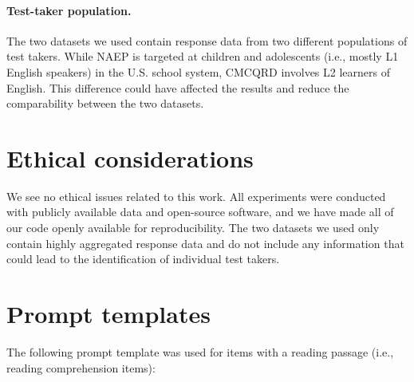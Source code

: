 \documentclass[11pt]{article}
\begin{document}
\paragraph{Test-taker population.}
The two datasets we used contain response data from two different populations of test takers. While NAEP is targeted at children and adolescents (i.e., mostly L1 English speakers) in the U.S. school system, CMCQRD involves L2 learners of English. This difference could have affected the results and reduce the comparability between the two datasets.

\section*{Ethical considerations}

We see no ethical issues related to this work. All experiments were conducted with publicly available data and open-source software, and we have made all of our code openly available for reproducibility. The two datasets we used only contain highly aggregated response data and do not include any information that could lead to the identification of individual test takers.





\onecolumn
\appendix

\section{Prompt templates}
\label{sec:appendix-prompt}

The following prompt template was used for items with a reading passage (i.e., reading comprehension items):

\noindent{}
\end{document}
